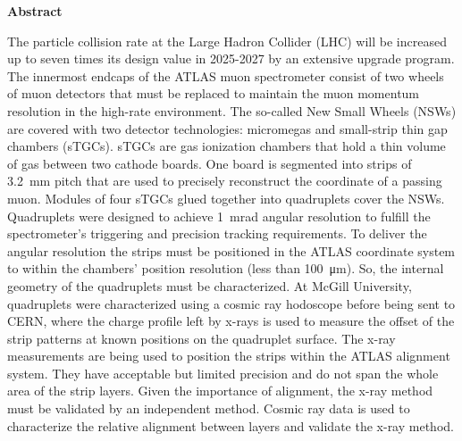 \renewcommand\contentsname{Table of Contents}
\tableofcontents
\cleardoublepage
{}    %


\begin{center}\textbf{Abstract}\end{center}

The particle collision rate at the Large Hadron Collider (LHC) will be increased up to seven times its design value in 2025-2027 by an extensive upgrade program. The innermost endcaps of the ATLAS muon spectrometer consist of two wheels of muon detectors that must be replaced to maintain the muon momentum resolution in the high-rate environment. The so-called New Small Wheels (NSWs) are covered with two detector technologies: micromegas and small-strip thin gap chambers (sTGCs). sTGCs are gas ionization chambers that hold a thin volume of gas between two cathode boards. One board is segmented into strips of \SI{3.2}{mm} pitch that are used to precisely reconstruct the coordinate of a passing muon. Modules of four sTGCs glued together into quadruplets cover the NSWs. Quadruplets were designed to achieve \SI{1}{mrad} angular resolution to fulfill the spectrometer's triggering and precision tracking requirements. To deliver the angular resolution the strips must be positioned in the ATLAS coordinate system to within the chambers' position resolution (less than \SI{100}{\micro\meter}). So, the internal geometry of the quadruplets must be characterized. At McGill University, quadruplets were characterized using a cosmic ray hodoscope before being sent to CERN, where the charge profile left by x-rays is used to measure the offset of the strip patterns at known positions on the quadruplet surface. The x-ray measurements are being used to position the strips within the ATLAS alignment system. They have acceptable but limited precision and do not span the whole area of the strip layers. Given the importance of alignment, the x-ray method must be validated by an independent method. Cosmic ray data is used to characterize the relative alignment between layers and validate the x-ray method.

